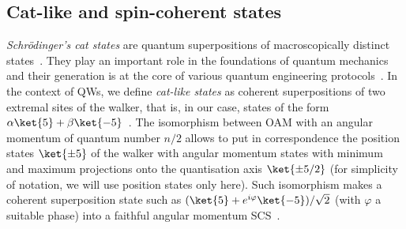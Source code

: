 \subsection{Cat-like and spin-coherent states}
\label{subsec:expQWs:catstates}

\emph{Schrödinger's cat states} are quantum superpositions of macroscopically distinct states~\cite{yurke1986generating,bužek1995quantum}.
They play an important role in the foundations of quantum mechanics~\cite{schrodinger1935gegenwartige} and their generation is at the core of various quantum engineering protocols~\cite{brune1992manipulation, monroe1996schrodinger,agarwal1997atomic, zhang2016creating}.
In the context of QWs, we define \emph{cat-like states} as coherent superpositions of two extremal sites of the walker, that is, in our case, states of the form $\alpha\ket{5}+\beta\ket{-5}$~\cite{zhang2016creating}. The isomorphism between \ac{OAM} with an angular momentum of quantum number $n/2$ allows to put in correspondence the position states $\ket{\pm 5}$ of the walker with angular momentum states with minimum and maximum projections onto the quantisation axis $\ket{\pm 5/2}$ (for simplicity of notation, we will use position states only here). Such isomorphism makes a coherent superposition state such as $(\ket{5}+e^{i\varphi}\ket{-5})/\sqrt{2}$ (with $\varphi$ a suitable phase) into a faithful angular momentum SCS~\cite{militello2006distilling}. 


